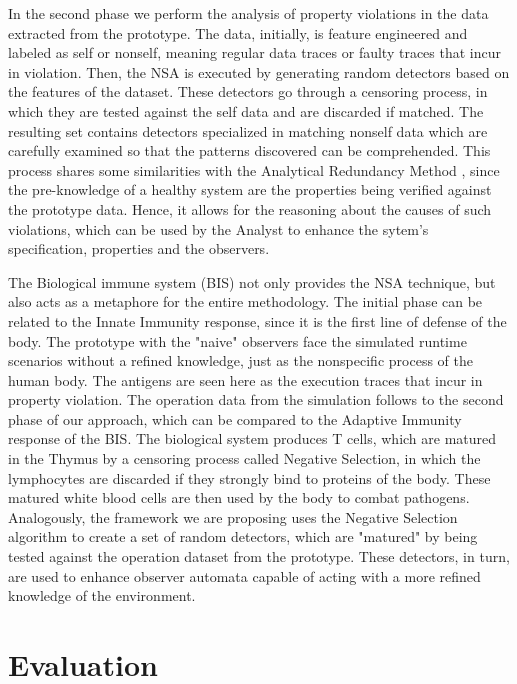 In the second phase we perform the analysis of property violations in the data extracted from the prototype. The data, initially, is feature engineered and labeled as self or nonself, meaning regular data traces or faulty traces that incur in violation. Then, the NSA is executed by generating random detectors based on the features of the dataset. These detectors go through a censoring process, in which they are tested against the self data and are discarded if matched. The resulting set contains detectors specialized in matching nonself data which are carefully examined so that the patterns discovered can be comprehended. This process shares some similarities with the Analytical Redundancy Method \cite{gao2015survey}, since the pre-knowledge of a healthy system are the properties being verified against the prototype data. Hence, it allows for the reasoning about the causes of such violations, which can be used by the Analyst to enhance the sytem's specification, properties and the observers.

The Biological immune system (BIS) not only provides the NSA technique, but also acts as a metaphore for the entire methodology. The initial phase can be related to the Innate Immunity response, since it is the first line of defense of the body. The prototype with the "naive" observers face the simulated runtime scenarios without a refined knowledge, just as the nonspecific process of the human body. The antigens are seen here as the execution traces that incur in property violation. The operation data from the simulation follows to the second phase of our approach, which can be compared to the Adaptive Immunity response of the BIS. The biological system produces T cells, which are matured in the Thymus by a censoring process called Negative Selection, in which the lymphocytes are discarded if they strongly bind to proteins of the body. These matured white blood cells are then used by the body to combat pathogens. Analogously, the framework we are proposing uses the Negative Selection algorithm to create a set of random detectors, which are "matured" by being tested against the operation dataset from the prototype. These detectors, in turn, are used to enhance observer automata capable of acting with a more refined knowledge of the environment. 

\section{Evaluation}

